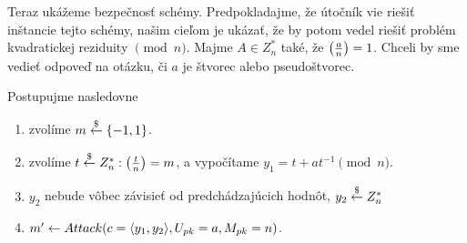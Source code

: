 \fixme[skip]
Teraz ukážeme bezpečnosť schémy. Predpokladajme, že útočník vie riešiť
inštancie tejto schémy, našim cieľom je ukázať, že by potom vedel
riešiť problém kvadratickej reziduity $\pmod{n}$.
Majme $A \in Z_n^*$ také, že $\left( \frac{a}{n} \right)=1$. Chceli by sme vedieť
odpoveď na otázku, či $a$ je štvorec alebo pseudoštvorec.

Postupujme nasledovne
\begin{enumerate}
    \item zvolíme $m \overset{\$}{\leftarrow} \{-1,1\}$.
    \item zvolíme $t \overset{\$}{\leftarrow} Z_n^*: \left( \frac{t}{n} \right)=m$, a vypočítame
        $y_1 = t + a t^{-1} \pmod{n}$.
    \item $y_2$ nebude vôbec závisieť od predchádzajúcich hodnôt,
            $y_2 \overset{\$}{\leftarrow} Z_n^*$
    \item $m' \leftarrow Attack(c=\langle y_1, y_2 \rangle, U_{pk}=a,M_{pk}=n)
            $.
\end{enumerate}
